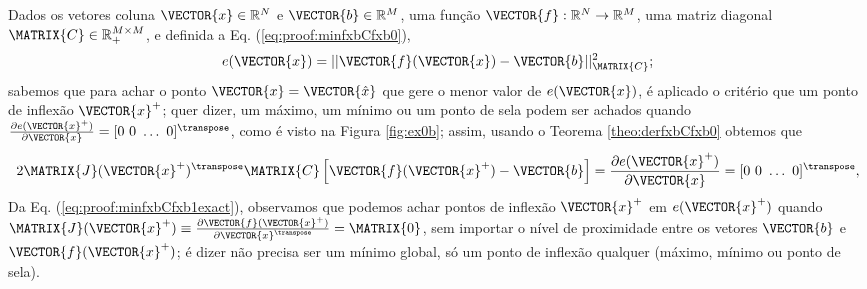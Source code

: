 \begin{myproofT}\label{proof:theo:minfxbCfxb}
Dados
os vetores coluna $\VECTOR{x}\in \mathbb{R}^N$ e $\VECTOR{b}\in \mathbb{R}^M$,  
uma função $\VECTOR{f}:\mathbb{R}^{N} \rightarrow \mathbb{R}^{M}$, 
uma matriz diagonal $\MATRIX{C} \in \mathbb{R}^{M\times M}_+$, e 
definida a Eq. (\ref{eq:proof:minfxbCfxb0}),
\begin{equation}\label{eq:proof:minfxbCfxb0}
e(\VECTOR{x})=||\VECTOR{f}(\VECTOR{x})-\VECTOR{b}||_{\MATRIX{C}}^2;
\end{equation}
sabemos que para achar o ponto $\VECTOR{x}=\VECTOR{\hat{x}}$ que gere o menor valor de $e(\VECTOR{x})$, é aplicado
o critério que um ponto de inflexão $\VECTOR{x}^+$; 
quer dizer, um máximo, um mínimo ou um ponto de sela podem ser achados quando 
$\frac{\partial e(\VECTOR{x}^+)}{\partial \VECTOR{x} }=[0~ 0~ \hdots~ 0 ]^{\transpose}$, 
como é visto na Figura \ref{fig:ex0b};
assim, usando o Teorema \ref{theo:derfxbCfxb0} obtemos que
\begin{equation}\label{eq:proof:minfxbCfxb1exact}
2 \MATRIX{J}(\VECTOR{x}^+)^{\transpose}\MATRIX{C}\left[ \VECTOR{f}(\VECTOR{x}^+)-\VECTOR{b} \right] =
\frac{\partial e(\VECTOR{x}^+)}{\partial \VECTOR{x} }=[0~ 0~ \hdots~ 0 ]^{\transpose},
\end{equation}
Da Eq. (\ref{eq:proof:minfxbCfxb1exact}), observamos que podemos achar pontos de inflexão $\VECTOR{x}^+$
em $e(\VECTOR{x}^+)$ quando 
$\MATRIX{J}(\VECTOR{x}^+) \equiv \frac{\partial \VECTOR{f}(\VECTOR{x}^+)}{\partial \VECTOR{x}^{\transpose} } = \MATRIX{0}$, 
sem importar o nível de proximidade entre os vetores $\VECTOR{b}$ e $\VECTOR{f}(\VECTOR{x}^+)$;
é dizer não precisa ser um mínimo global, só um ponto de inflexão qualquer
(máximo, mínimo ou ponto de sela).


\end{myproofT}
